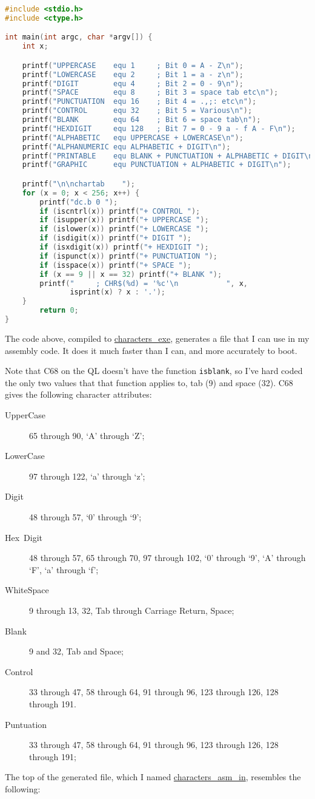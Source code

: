 \begin{lstlisting}[caption={C68 utility: characters\_c},language=C]
#include <stdio.h> 
#include <ctype.h>

int main(int argc, char *argv[]) {
    int x;

    printf("UPPERCASE    equ 1     ; Bit 0 = A - Z\n");
    printf("LOWERCASE    equ 2     ; Bit 1 = a - z\n");
    printf("DIGIT        equ 4     ; Bit 2 = 0 - 9\n");
    printf("SPACE        equ 8     ; Bit 3 = space tab etc\n");
    printf("PUNCTUATION  equ 16    ; Bit 4 = .,;: etc\n");
    printf("CONTROL      equ 32    ; Bit 5 = Various\n");
    printf("BLANK        equ 64    ; Bit 6 = space tab\n");
    printf("HEXDIGIT     equ 128   ; Bit 7 = 0 - 9 a - f A - F\n");
    printf("ALPHABETIC   equ UPPERCASE + LOWERCASE\n");
    printf("ALPHANUMERIC equ ALPHABETIC + DIGIT\n");
    printf("PRINTABLE    equ BLANK + PUNCTUATION + ALPHABETIC + DIGIT\n");
    printf("GRAPHIC      equ PUNCTUATION + ALPHABETIC + DIGIT\n");

    printf("\n\nchartab    ");
    for (x = 0; x < 256; x++) {
        printf("dc.b 0 ");
        if (iscntrl(x)) printf("+ CONTROL ");
        if (isupper(x)) printf("+ UPPERCASE ");
        if (islower(x)) printf("+ LOWERCASE ");
        if (isdigit(x)) printf("+ DIGIT ");
        if (isxdigit(x)) printf("+ HEXDIGIT ");
        if (ispunct(x)) printf("+ PUNCTUATION ");
        if (isspace(x)) printf("+ SPACE ");
        if (x == 9 || x == 32) printf("+ BLANK ");
        printf("     ; CHR$(%d) = '%c'\n           ", x,
               isprint(x) ? x : '.');
    }
        return 0;
} 
\end{lstlisting}

The code above, compiled to \url{characters_exe}, generates a file
that I can use in my assembly code. It does it much faster than I
can, and more accurately to boot. 

Note that C68 on the QL doesn't have the function \lstinline!isblank!,
so I've hard coded the only two values that that function applies
to, tab (9) and space (32). C68 gives the following character attributes:
\begin{description}
\item [{UpperCase}] 65 through 90, `A' through `Z';
\item [{LowerCase}] 97 through 122, `a' through `z';
\item [{Digit}] 48 through 57, `0' through `9';
\item [{Hex~Digit}] 48 through 57, 65 through 70, 97 through 102, `0'
through `9', `A' through `F', `a' through `f';
\item [{WhiteSpace}] 9 through 13, 32, Tab through Carriage Return, Space;
\item [{Blank}] 9 and 32, Tab and Space;
\item [{Control}] 33 through 47, 58 through 64, 91 through 96, 123 through
126, 128 through 191.
\item [{Puntuation}] 33 through 47, 58 through 64, 91 through 96, 123 through
126, 128 through 191;
\end{description}
The top of the generated file, which I named \url{characters_asm_in},
resembles the following:

